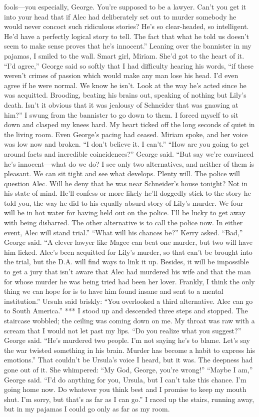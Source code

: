 \documentclass{novel}
\begin{document}
fools—you especially, George. You’re supposed to be a lawyer. Can’t you get it into your head that if Alec had deliberately set out to murder somebody he would never concoct such ridiculous stories? He’s so clear-headed, so intelligent. He’d have a perfectly logical story to tell. The fact that what he told us doesn’t seem to make sense proves that he’s innocent.” Leaning over the bannister in my pajamas, I smiled to the wall. Smart girl, Miriam. She’d got to the heart of it. “I’d agree,” George said so softly that I had difficulty hearing his words, “if these weren’t crimes of passion which would make any man lose his head. I’d even agree if he were normal. We know he isn’t. Look at the way he’s acted since he was acquitted. Brooding, beating his brains out, speaking of nothing but Lily’s death. Isn’t it obvious that it was jealousy of Schneider that was gnawing at him?” I swung from the bannister to go down to them. I forced myself to sit down and clasped my knees hard. My heart ticked off the long seconds of quiet in the living room. Even George’s pacing had ceased. Miriam spoke, and her voice was low now and broken. “I don’t believe it. I can’t.” “How are you going to get around facts and incredible coincidences?” George said. “But say we’re convinced he’s innocent—what do we do? I see only two alternatives, and neither of them is pleasant. We can sit tight and see what develops. Plenty will. The police will question Alec. Will he deny that he was near Schneider’s house tonight? Not in his state of mind. He’ll confess or more likely he’ll doggedly stick to the story he told you, the way he did to his equally absurd story of Lily’s murder. We four will be in hot water for having held out on the police. I’ll be lucky to get away with being disbarred. The other alternative is to call the police now. In either event, Alec will stand trial.” “What will his chances be?” Kerry asked. “Bad,” George said. “A clever lawyer like Magee can beat one murder, but two will have him licked. Alec’s been acquitted for Lily’s murder, so that can’t be brought into the trial, but the D.A. will find ways to link it up. Besides, it will be impossible to get a jury that isn’t aware that Alec had murdered his wife and that the man for whose murder he was being tried had been her lover. Frankly, I think the only thing we can hope for is to have him found insane and sent to a mental institution.” Ursula said briskly: “You overlooked a third alternative. Alec can go to South America.” *** I stood up and descended three steps and stopped. The staircase wobbled; the ceiling was coming down on me. My throat was raw with a scream that I would not let past my lips. “Do you realize what you suggest?” George said. “He’s murdered two people. I’m not saying he’s to blame. Let’s say the war twisted something in his brain. Murder has become a habit to express his emotions.” That couldn’t be Ursula’s voice I heard, but it was. The deepness had gone out of it. She whimpered: “My God, George, you’re wrong!” “Maybe I am,” George said. “I’d do anything for you, Ursula, but I can’t take this chance. I’m going home now. Do whatever you think best and I promise to keep my mouth shut. I’m sorry, but that’s as far as I can go.” I raced up the stairs, running away, but in my pajamas I could go only as far as my room. 
\end{document}
